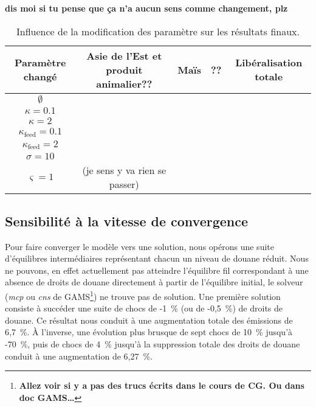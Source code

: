 \textbf{dis moi si tu pense que ça n'a aucun sens comme changement, plz}
\begin{table}[hbt!]
    \centering
    \caption{Influence de la modification des paramètre sur les résultats finaux.}
    \label{tab:sensibilite_param}
    \begin{tabular}{c|cccc}
        \hline
        Paramètre changé           & Asie de l'Est et produit animalier?? & Maïs & ?? & Libéralisation totale \\ \hline
        $\emptyset$                &                                      &      &    &                       \\
        $\kappa = 0.1$             &                                      &      &    &                       \\
        $\kappa = 2$               &                                      &      &    &                       \\
        $\kappa_\text{feed} = 0.1$ &                                      &      &    &                       \\
        $\kappa_\text{feed} = 2$   &                                      &      &    &                       \\
        $\sigma = 10$              &                                      &      &    &                       \\
        $\varsigma = 1$            & (je sens y va rien se passer)                                            \\
    \end{tabular}%
\end{table}

\subsection{Sensibilité à la vitesse de convergence}\label{subsec:vit_cvg}

Pour faire converger le modèle vers une solution, nous opérons une suite d'équilibres intermédiaires représentant chacun un niveau de douane réduit. Nous ne pouvons, en effet actuellement pas atteindre l'équilibre fil correspondant à une absence de droits de douane directement à partir de l'équilibre initial, le solveur (\textit{mcp} ou \textit{cns} de GAMS\footnote{\textbf{Allez voir si y a pas des trucs écrits dans le cours de CG. Ou dans doc GAMS\dots}}) ne trouve pas de solution. Une première solution consiste à succéder une suite de chocs de -1~\% (ou de -0,5~\%) de droits de douane. Ce résultat nous conduit à une augmentation totale des émissions de 6,7~\%. À l'inverse, une évolution plus brusque de sept chocs de 10~\% jusqu'à -70~\%, puis de chocs de 4~\% jusqu'à la suppression totale des droits de douane conduit à une augmentation de 6,27~\%.

